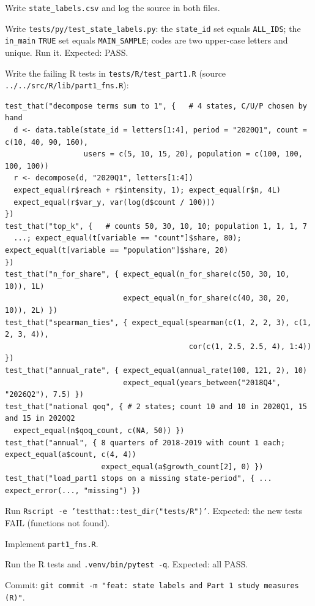 \documentclass[10pt,a4paper]{article}
\newcommand{\f}[1]{\texttt{#1}}
\begin{document}
\begin{steps}
\item Write \f{state\_labels.csv} and log the source in both files.
\item Write \f{tests/py/test\_state\_labels.py}: the \f{state\_id} set equals \f{ALL\_IDS}; the \f{in\_main}
      \f{TRUE} set equals \f{MAIN\_SAMPLE}; codes are two upper-case letters and unique. Run it. Expected: PASS.
\item Write the failing R tests in \f{tests/R/test\_part1.R} (source \f{../../src/R/lib/part1\_fns.R}):
\begin{verbatim}
test_that("decompose terms sum to 1", {   # 4 states, C/U/P chosen by hand
  d <- data.table(state_id = letters[1:4], period = "2020Q1", count = c(10, 40, 90, 160),
                  users = c(5, 10, 15, 20), population = c(100, 100, 100, 100))
  r <- decompose(d, "2020Q1", letters[1:4])
  expect_equal(r$reach + r$intensity, 1); expect_equal(r$n, 4L)
  expect_equal(r$var_y, var(log(d$count / 100)))
})
test_that("top_k", {   # counts 50, 30, 10, 10; population 1, 1, 1, 7
  ...; expect_equal(t[variable == "count"]$share, 80); expect_equal(t[variable == "population"]$share, 20)
})
test_that("n_for_share", { expect_equal(n_for_share(c(50, 30, 10, 10)), 1L)
                           expect_equal(n_for_share(c(40, 30, 20, 10)), 2L) })
test_that("spearman_ties", { expect_equal(spearman(c(1, 2, 2, 3), c(1, 2, 3, 4)),
                                          cor(c(1, 2.5, 2.5, 4), 1:4)) })
test_that("annual_rate", { expect_equal(annual_rate(100, 121, 2), 10)
                           expect_equal(years_between("2018Q4", "2026Q2"), 7.5) })
test_that("national qoq", { # 2 states; count 10 and 10 in 2020Q1, 15 and 15 in 2020Q2
  expect_equal(n$qoq_count, c(NA, 50)) })
test_that("annual", { 8 quarters of 2018-2019 with count 1 each; expect_equal(a$count, c(4, 4))
                      expect_equal(a$growth_count[2], 0) })
test_that("load_part1 stops on a missing state-period", { ... expect_error(..., "missing") })
\end{verbatim}
\item Run \f{Rscript -e 'testthat::test\_dir("tests/R")'}. Expected: the new tests FAIL (functions not found).
\item Implement \f{part1\_fns.R}.
\item Run the R tests and \f{.venv/bin/pytest -q}. Expected: all PASS.
\item Commit: \f{git commit -m "feat: state labels and Part 1 study measures (R)"}.
\end{steps}
\end{document}
